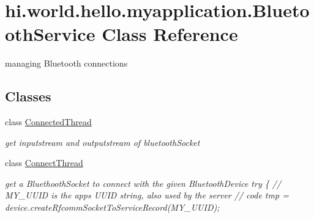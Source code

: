 \hypertarget{classhi_1_1world_1_1hello_1_1myapplication_1_1_bluetooth_service}{}\section{hi.\+world.\+hello.\+myapplication.\+Bluetooth\+Service Class Reference}
\label{classhi_1_1world_1_1hello_1_1myapplication_1_1_bluetooth_service}


managing Bluetooth connections  


\subsection*{Classes}
\begin{DoxyCompactItemize}
\item 
class \mbox{\hyperlink{classhi_1_1world_1_1hello_1_1myapplication_1_1_bluetooth_service_1_1_connected_thread}{Connected\+Thread}}
\begin{DoxyCompactList}\small\item\em get inputstream and outputstream of bluetooth\+Socket \end{DoxyCompactList}\item 
class \mbox{\hyperlink{classhi_1_1world_1_1hello_1_1myapplication_1_1_bluetooth_service_1_1_connect_thread}{Connect\+Thread}}
\begin{DoxyCompactList}\small\item\em get a Bluethooth\+Socket to connect with the given Bluetooth\+Device try \{ // M\+Y\+\_\+\+U\+U\+ID is the app\textquotesingle{}s U\+U\+ID string, also used by the server // code tmp = device.\+create\+Rfcomm\+Socket\+To\+Service\+Record(\+M\+Y\+\_\+\+U\+U\+I\+D); \end{DoxyCompactList}\end{DoxyCompactItemize}
